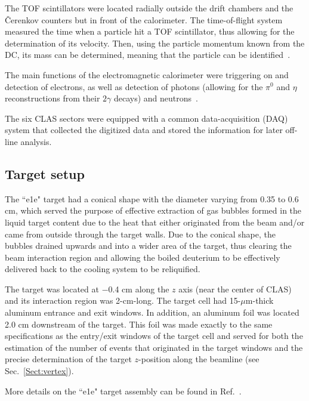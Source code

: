 \documentclass[prc,twocolumn,superscriptaddress,showpacs,amssymb,amsmath,amsfonts,aps,nofootinbib]{revtex4-1}
\begin{document}
The TOF scintillators were located radially outside the drift chambers and the \v Cerenkov counters but in front of the calorimeter. The time-of-flight system measured the time when a particle hit a TOF scintillator, thus allowing for the determination of its velocity. Then, using the particle momentum known from the DC, its mass can be determined, meaning that the particle can be identified~\cite{Smith:1999ii, clas_tof_paddles}.

The main functions of the electromagnetic calorimeter were triggering on and detection of electrons, as well as detection of photons (allowing for the $\pi^{0}$ and $\eta$ reconstructions from their $2\gamma$ decays) and neutrons~\cite{Amarian:2001zs}. 

The six CLAS sectors were equipped with a common data-acquisition (DAQ) system that collected the digitized data and stored the information for later off-line analysis.


\subsection{Target setup}
\label{Sect:target_setup}

The ``e1e" target had a conical shape with the diameter varying from 0.35 to 0.6 cm, which served the purpose of effective extraction of gas bubbles formed in the liquid target content due to the heat that either originated from the beam and/or came from outside through the target walls. Due to the conical shape, the bubbles drained upwards and into a wider area of the target, thus clearing the beam interaction region and allowing the boiled deuterium to be effectively delivered back to the cooling system to be reliquified. 

The target was located at $-$0.4 cm along the $z$ axis (near the center of CLAS) and its interaction region was 2-cm-long. The target cell had 15-$\mu$m-thick aluminum entrance and exit windows. In addition, an aluminum foil was located 2.0 cm downstream of the target. This foil was made exactly to the same specifications as the entry/exit windows of the target cell and served for both the estimation of the number of events that originated in the target windows and the precise determination of the target $z$-position along the beamline (see Sec.\!~\ref{Sect:vertex}).

More details on the ``e1e" target assembly can be found in Ref.\!~\cite{target}.
\end{document}
